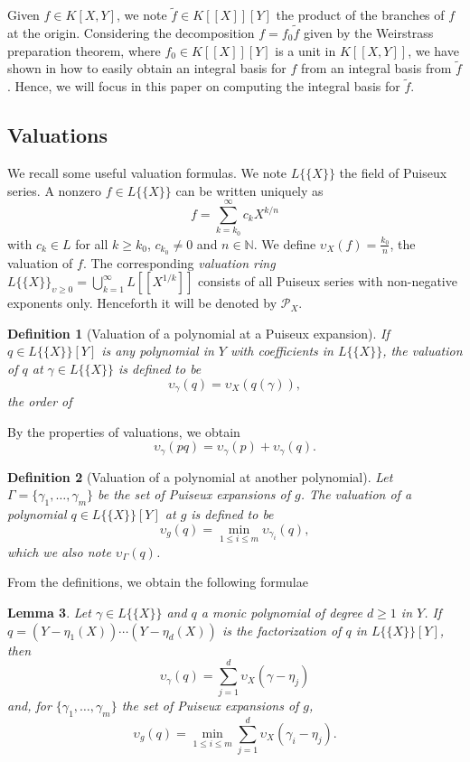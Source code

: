 \documentclass[a4paper,11pt]{amsart}%
\theoremstyle{definition}
\theoremstyle{plain}
\newtheorem{defn}{Definition}[section]
\newtheorem{lemma}[defn]{Lemma}
\theoremstyle{remark}
\newcommand{\N}{{\mathbb N}}
\begin{document}
Given $f \in K[X,Y]$, we note $\tilde f \in K[[X]][Y]$ the product of the branches of $f$ at the origin. Considering the decomposition $f = f_0 \tilde f$ given by the Weirstrass preparation theorem, where $f_0 \in K[[X]][Y]$ is a unit in $K[[X,Y]]$, we have shown in \cite[Proposition 41]{intbas} how to easily obtain an integral basis for $f$ from an integral basis from $\tilde f$. Hence, we will focus in this paper on computing the integral basis for $\tilde f$.

\subsection{Valuations}

We recall some useful valuation formulas. We note $L\{\{X\}\}$ the field of Puiseux series. A nonzero $f \in L\{\{X\}\}$ can be written uniquely as
$$
f = \sum_{k = k_0}^\infty c_k X^{k / n}
$$
with $c_k \in L$ for all $k \ge k_0$, $c_{k_0} \neq 0$ and $n \in \N$. We define $\upsilon_X(f) = \frac{k_0}{n}$, the valuation of $f$.
The corresponding \emph{valuation ring}
$L\{\{X\}\}_{\upsilon\geq0}=\bigcup_{k=1}^{\infty}L[[X^{1/k}]]$ consists of all Puiseux series
with non-negative exponents only. Henceforth it will be denoted by ${\mathcal{P}_{X}}$.


\begin{defn}[Valuation of a polynomial at a Puiseux expansion]
If $q\in L\{\{X\}\}[Y]$ is any polynomial in $Y$ with coefficients in
$L\{\{X\}\}$, the {\emph{valuation}} of $q$ at $\gamma\in L\{\{X\}\}$ is
defined to be
$$\upsilon_{\gamma}(q)=\upsilon_X(q(\gamma)),$$
the order of 
\end{defn}

By the properties of valuations, we obtain
$$
\upsilon_{\gamma}(pq)= \upsilon_{\gamma}(p) + \upsilon_{\gamma}(q).
$$




\begin{defn}[Valuation of a polynomial at another polynomial]
Let $\Gamma=\{\gamma_{1},\dots,\gamma_{m}\}$ be the set of Puiseux
expansions of $g$. The {\emph{valuation}} of a polynomial $q\in L\{\{X\}\}[Y]$
at $g$ is defined to be
$$\upsilon_{g}(q)=\min_{1 \leq i \leq m} \upsilon_{\gamma_{i}}(q),$$
which we also note $\upsilon_{\Gamma}(q)$.
\end{defn}

From the definitions, we obtain the following formulae

\begin{lemma}
\label{lemma:gammaAtq}
Let $\gamma \in L\{\{X\}\}$ and $q$ a monic polynomial of degree $d\geq 1$ in $Y$.  %
If $q=(Y-\eta_{1}(X))\cdots(Y-\eta_{d}(X))$ is the factorization of $q$ in $L\{\{X\}\}[Y]$, then
\[
\upsilon_{\gamma}(q)= \sum_{j=1}^{d}\upsilon_X(\gamma-\eta_{j})
\]
and, for $\{\gamma_{1},\dots,\gamma_{m}\}$ the set of Puiseux expansions of $g$,
\[
\upsilon_{g}(q)=\min_{1 \leq i \leq m}\sum_{j=1}^{d}\upsilon_X(\gamma_{i}-\eta_{j})\text{.}%
\]
\end{lemma}
\end{document}
